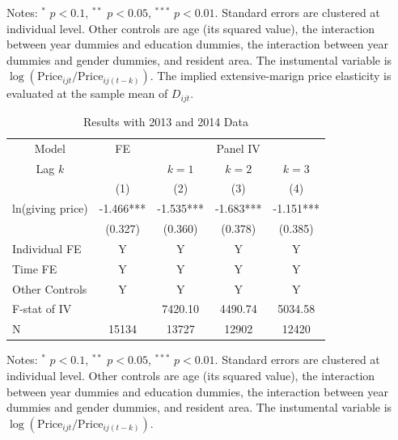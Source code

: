 \documentclass[ review  , 3p ]{elsarticle}
\begin{document}
\begin{table}
\begin{threeparttable}
\begin{tabular}[t]{lccc}
  \bottomrule
  \end{tabular}
  \begin{tablenotes}
  \item Notes: $^{*}$ $p < 0.1$, $^{**}$ $p < 0.05$, $^{***}$ $p < 0.01$. Standard errors are clustered at individual level. Other controls are age (its squared value), the interaction between year dummies and education dummies, the interaction between year dummies and gender dummies, and resident area. The instumental variable is $\log(\text{Price}_{ijt}/\text{Price}_{ij(t-k)})$. The implied extensive-marign price elasticity is evaluated at the sample mean of $D_{ijt}$.
  \end{tablenotes}
  \end{threeparttable}
  \end{table}
  
  \begin{table}
  
  \caption{\label{tab:kableShortEstimateElasticity}Results with 2013 and 2014 Data}
  \centering
  \begin{threeparttable}
  \begin{tabular}[t]{lcccc}
  \toprule
  \multicolumn{1}{c}{Model} & \multicolumn{1}{c}{FE} & \multicolumn{3}{c}{Panel IV} \\
  \cmidrule(l{3pt}r{3pt}){1-1} \cmidrule(l{3pt}r{3pt}){2-2} \cmidrule(l{3pt}r{3pt}){3-5}
  \multicolumn{1}{c}{Lag $k$} & \multicolumn{1}{c}{ } & \multicolumn{1}{c}{$k = 1$} & \multicolumn{1}{c}{$k = 2$} & \multicolumn{1}{c}{$k = 3$} \\
  \cmidrule(l{3pt}r{3pt}){1-1} \cmidrule(l{3pt}r{3pt}){3-3} \cmidrule(l{3pt}r{3pt}){4-4} \cmidrule(l{3pt}r{3pt}){5-5}
   & (1) & (2) & (3) & (4)\\
  \midrule
  ln(giving price) & -1.466*** & -1.535*** & -1.683*** & -1.151***\\
   & (0.327) & (0.360) & (0.378) & (0.385)\\
  Individual FE & Y & Y & Y & Y\\
  Time FE & Y & Y & Y & Y\\
  Other Controls & Y & Y & Y & Y\\
  F-stat of IV &  & 7420.10 & 4490.74 & 5034.58\\
  N & 15134 & 13727 & 12902 & 12420\\
  \bottomrule
  \end{tabular}
  \begin{tablenotes}
  \item Notes: $^{*}$ $p < 0.1$, $^{**}$ $p < 0.05$, $^{***}$ $p < 0.01$. Standard errors are clustered at individual level. Other controls are age (its squared value), the interaction between year dummies and education dummies, the interaction between year dummies and gender dummies, and resident area. The instumental variable is $\log(\text{Price}_{ijt}/\text{Price}_{ij(t-k)})$.
  \end{tablenotes}
  \end{threeparttable}
  \end{table}
  
\end{document}
